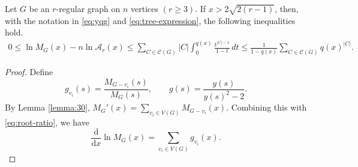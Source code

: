 \documentclass[11pt, a4paper]{article}
\begin{document}
\begin{lemma}\label{lemma:matching-excess}
Let $G$ be an $r$-regular graph on $n$ vertices $(r\geq3)$. If $x>2\sqrt{2(r-1)}$,
then, with the notation in \eqref{eq:yqg} and \eqref{eq:tree-expression}, the following inequalities hold.
\begin{align}
 0\leq\ln M_G(x)-n\ln\mathcal{A}_r(x)
 \leq\sum_{C\in\mathcal{C}(G)}
    |C|\int_0^{q(x)}\frac{t^{|C|-1}}{1-t}\, dt
 \leq\frac1{1-q(x)}\sum_{C\in\mathcal{C}(G)}q(x)^{|C|}. \label{eq:matching-excess}
\end{align}
\end{lemma}
\begin{proof}
Define
\[
g_{v_i}(s)=\frac{M_{G-v_i}(s)}{M_G(s)},
\qquad
g(s)=\frac{y(s)}{y(s)^2-2}.
\]
By Lemma \ref{lemma:30},
$M_G'(x)=\sum_{v_i\in V(G)}M_{G-v_i}(x)$.
Combining this with \eqref{eq:root-ratio}, we have
\begin{equation}\label{eq:matching-log-derivative}
\frac{\mathrm{d}}{\mathrm{d}x} \ln M_G(x) = \sum_{v_i \in V(G)} g_{v_i}(x).
\end{equation}


\end{proof}
\end{document}

